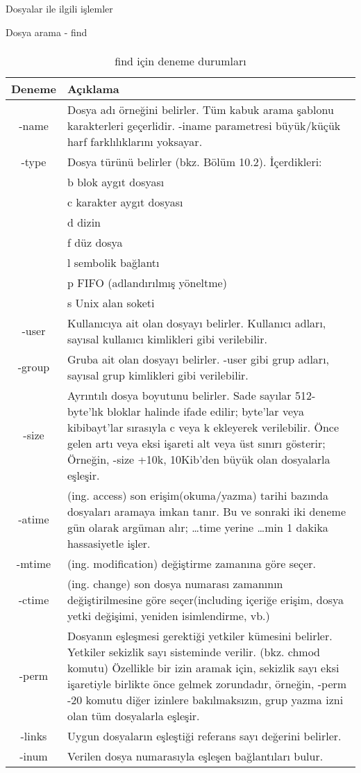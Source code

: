 \documentclass[10pt,a5paper]{book}
\begin{document}
\begin{section}{Dosyalar ile ilgili işlemler}
\begin{subsection}{Dosya arama - find}
\paragraph{}{
\begin {table}[H]
\caption {find için deneme durumları} \label{tab:title} 
\begin{tabular}{c l}
\hline
Deneme & Açıklama \\
\hline
-name & Dosya adı örneğini belirler. Tüm kabuk arama şablonu karakterleri geçerlidir. -iname parametresi büyük/küçük harf farklılıklarını yoksayar. \\
-type & Dosya türünü belirler (bkz. Bölüm 10.2). İçerdikleri:\\
 & b blok aygıt dosyası\\
 & c karakter aygıt dosyası\\
 & d dizin\\
 & f düz dosya\\
 & l sembolik bağlantı\\
 & p FIFO (adlandırılmış yöneltme)\\
 & s Unix alan soketi\\
-user & Kullanıcıya ait olan dosyayı belirler. Kullanıcı adları, sayısal kullanıcı kimlikleri gibi verilebilir.\\
-group & Gruba ait olan dosyayı belirler. -user gibi grup adları, sayısal grup kimlikleri gibi verilebilir.\\
-size & Ayrıntılı dosya boyutunu belirler. Sade sayılar 512-byte'lık bloklar halinde ifade edilir; byte'lar veya kibibayt'lar sırasıyla c veya k ekleyerek verilebilir. Önce gelen artı veya eksi işareti alt veya üst sınırı gösterir; Örneğin, -size +10k, 10Kib'den büyük olan dosyalarla eşleşir.\\
-atime & (ing. access) son erişim(okuma/yazma) tarihi bazında dosyaları aramaya imkan tanır.  Bu ve sonraki iki deneme gün olarak argüman alır; …time yerine …min 1 dakika hassasiyetle işler.\\
-mtime & (ing. modification) değiştirme zamanına göre seçer.\\
-ctime & (ing. change) son dosya numarası zamanının değiştirilmesine göre seçer(including içeriğe erişim, dosya yetki değişimi, yeniden isimlendirme, vb.)\\
-perm & Dosyanın eşleşmesi gerektiği yetkiler kümesini belirler. Yetkiler sekizlik sayı sisteminde verilir. (bkz. chmod komutu)
Özellikle bir izin aramak için, sekizlik sayı eksi işaretiyle birlikte önce gelmek zorundadır, örneğin, -perm -20 komutu diğer izinlere bakılmaksızın, grup yazma izni olan tüm dosyalarla eşleşir.\\
-links & Uygun dosyaların eşleştiği referans sayı değerini belirler.\\
-inum & Verilen dosya numarasıyla eşleşen bağlantıları bulur.\\
\hline
\end{tabular}
\end {table}
}

\end{subsection}
\end{section}
\end{document}
